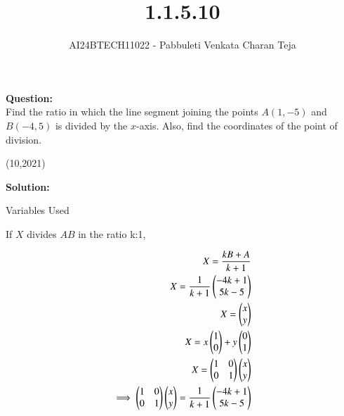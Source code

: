 \documentclass[journal]{IEEEtran}
\begin{document}

\vspace{3cm}

\title{1.1.5.10}
\author{AI24BTECH11022 - Pabbuleti Venkata Charan Teja}
\maketitle

\renewcommand{\thefigure}{\theenumi}
\renewcommand{\thetable}{\theenumi}

\textbf{Question:}\\
Find the ratio in which the line segment joining the points $A(1,-5)$ and $B(-4,5)$ is divided by the $x$-axis. Also, find the coordinates of the point of division.

\hfill{(10,2021)}

\textbf{Solution:}

\begin{table}[h!]
\renewcommand{\thetable}{1}
    \centering
   
   \def\tablename{Table}
   \caption{Variables Used}
    \label{tab1.1.5.10.1}
\end{table}
If $X$ divides $AB$ in the ratio k:1,

\begin{align}
X=\frac{kB+A}{k+1} \label{eq1.1.5.10.1} \\
X=\frac{1}{k+1}
\begin{pmatrix}
-4k+1 \\
5k-5 \\
\end{pmatrix} \label{eq1.1.5.10.2} \\
X=
\begin{pmatrix}
x \\
y \\
\end{pmatrix} \\
X=x\begin{pmatrix}1 \\ 0 \\\end{pmatrix}+y\begin{pmatrix}0 \\ 1 \\\end{pmatrix} \label{eq1.1.5.10.3}\\
X=
\begin{pmatrix}
1 & 0 \\
0 & 1 \\
\end{pmatrix}
\begin{pmatrix}
x \\
y \\
\end{pmatrix}\label{eq1.1.5.10.4} \\
\implies
\begin{pmatrix}
1 & 0 \\
0 & 1 \\
\end{pmatrix}
\begin{pmatrix}
x \\
y \\
\end{pmatrix}
=\frac{1}{k+1}
\begin{pmatrix}
-4k+1 \\
5k-5 \\
\end{pmatrix} \label{eq1.1.5.10.5}
\end{align}
\end{document}
